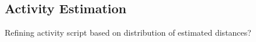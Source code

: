 \subsection{Activity Estimation}

Refining activity script based on distribution of estimated distances?